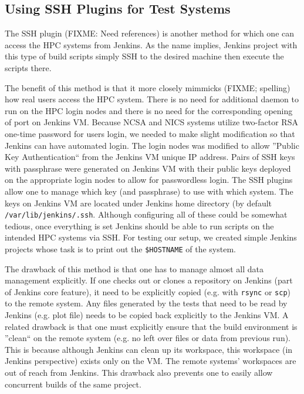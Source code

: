 \documentclass[10pt, conference, compsocconf]{IEEEtran}
\begin{document}
\subsection{Using SSH Plugins for Test Systems}
The SSH plugin (FIXME: Need references) is another method for which one can access the HPC systems from Jenkins. As the name implies, Jenkins project with this type of build scripts simply SSH to the desired machine then execute the scripts there. 

The benefit of this method is that it more closely mimmicks (FIXME; spelling) how real users access the HPC system. There is no need for additional daemon to run on the HPC login nodes and there is no need for the corresponding opening of port on Jenkins VM. Because NCSA and NICS systems utilize two-factor RSA one-time password for users login, we needed to make slight modification so that Jenkins can have automated login. The login nodes  was modified to allow ''Public Key Authentication`` from the Jenkins VM unique IP address. Pairs of SSH keys with passphrase were generated on Jenkins VM with their public keys deployed on the appropriate login nodes to allow for passwordless login. The SSH plugins allow one to manage which key (and passphrase) to use with which system. The keys on Jenkins VM are located under Jenkins home directory (by default \texttt{/var/lib/jenkins/.ssh}. Although configuring all of these could be somewhat tedious, once everything is set Jenkins should be able to run scripts on the intended HPC systems via SSH. For testing our setup, we created simple Jenkins projects whose task is to print out the \texttt{\$HOSTNAME} of the system.

The drawback of this method is that one has to manage almost all data management explicitly. If one checks out or clones a repository on Jenkins (part of Jenkins core feature), it need to be explicitly copied (e.g. with \texttt{rsync} or \texttt{scp}) to the remote system. Any files generated by the tests that need to be read by Jenkins (e.g. plot file) needs to be copied back explicitly to the Jenkins VM. A related drawback is that one must explicitly ensure that the build environment is ''clean`` on the remote system (e.g. no left over files or data from previous run). This is because although Jenkins can clean up its workspace, this workspace (in Jenkins perspective) exists only on the VM. The remote systems' workspaces are out of reach from Jenkins. This drawback also prevents one to easily allow concurrent builds of the same project. 
\end{document}
